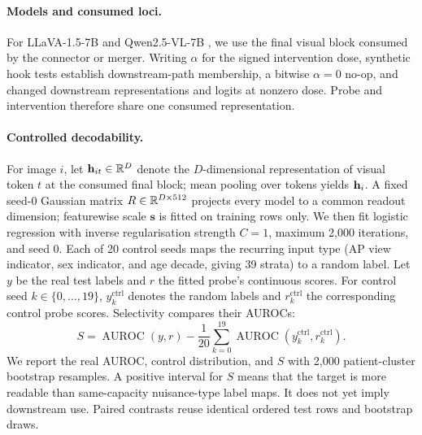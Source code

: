 \documentclass{article}
\begin{document}
\paragraph{Models and consumed loci.}
For LLaVA-1.5-7B \citep{liu2024improved} and Qwen2.5-VL-7B \citep{bai2025qwen25vl}, we use the final visual block consumed by the connector or merger. Writing $\alpha$ for the signed intervention dose, synthetic hook tests establish downstream-path membership, a bitwise $\alpha=0$ no-op, and changed downstream representations and logits at nonzero dose. Probe and intervention therefore share one consumed representation.

\paragraph{Controlled decodability.}
For image $i$, let $\mathbf{h}_{it}\in\mathbb{R}^D$ denote the $D$-dimensional representation of visual token $t$ at the consumed final block; mean pooling over tokens yields $\mathbf{h}_i$. A fixed seed-0 Gaussian matrix $R\in\mathbb{R}^{D\times512}$ projects every model to a common readout dimension; featurewise scale $\boldsymbol{s}$ is fitted on training rows only. We then fit logistic regression with inverse regularisation strength $C=1$, maximum 2,000 iterations, and seed 0. Each of 20 control seeds maps the recurring input type (AP view indicator, sex indicator, and age decade, giving 39 strata) to a random label. Let $y$ be the real test labels and $r$ the fitted probe's continuous scores. For control seed $k\in\{0,\ldots,19\}$, $y_k^{\mathrm{ctrl}}$ denotes the random labels and $r_k^{\mathrm{ctrl}}$ the corresponding control probe scores. Selectivity compares their AUROCs:
\begin{equation}
S = \operatorname{AUROC}(y,r)-\frac{1}{20}\sum_{k=0}^{19}\operatorname{AUROC}(y_k^{\mathrm{ctrl}},r_k^{\mathrm{ctrl}}).
\label{eq:seed-selectivity}
\end{equation}
We report the real AUROC, control distribution, and $S$ with 2,000 patient-cluster bootstrap resamples. A positive interval for $S$ means that the target is more readable than same-capacity nuisance-type label maps. It does not yet imply downstream use. Paired contrasts reuse identical ordered test rows and bootstrap draws.
\end{document}

